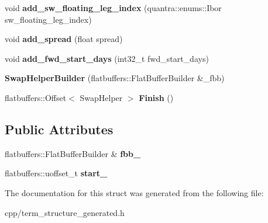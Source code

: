 \begin{DoxyCompactItemize}
void {\bfseries add\+\_\+sw\+\_\+floating\+\_\+leg\+\_\+index} (quantra\+::enums\+::\+Ibor sw\+\_\+floating\+\_\+leg\+\_\+index)
\item 
\mbox{\label{structquantra_1_1SwapHelperBuilder_ab94d6e15a57f3050b1f1666f11b54816}} 
void {\bfseries add\+\_\+spread} (float spread)
\item 
\mbox{\label{structquantra_1_1SwapHelperBuilder_a05700d90782f95a67c07dbb11b04e0ad}} 
void {\bfseries add\+\_\+fwd\+\_\+start\+\_\+days} (int32\+\_\+t fwd\+\_\+start\+\_\+days)
\item 
\mbox{\label{structquantra_1_1SwapHelperBuilder_a283641ed4c98e478c18e20b4c5f03aa2}} 
{\bfseries Swap\+Helper\+Builder} (flatbuffers\+::\+Flat\+Buffer\+Builder \&\+\_\+fbb)
\item 
\mbox{\label{structquantra_1_1SwapHelperBuilder_a73f189c6915df4a69ee15957fe16f0c1}} 
flatbuffers\+::\+Offset$<$ Swap\+Helper $>$ {\bfseries Finish} ()
\end{DoxyCompactItemize}
\subsection*{Public Attributes}
\begin{DoxyCompactItemize}
\item 
\mbox{\label{structquantra_1_1SwapHelperBuilder_a07560d63514f41a9510d5b51b1b53466}} 
flatbuffers\+::\+Flat\+Buffer\+Builder \& {\bfseries fbb\+\_\+}
\item 
\mbox{\label{structquantra_1_1SwapHelperBuilder_af5a8bd1d772ee0c1d915ec667202fd8d}} 
flatbuffers\+::uoffset\+\_\+t {\bfseries start\+\_\+}
\end{DoxyCompactItemize}


The documentation for this struct was generated from the following file\+:\begin{DoxyCompactItemize}
\item 
cpp/term\+\_\+structure\+\_\+generated.\+h\end{DoxyCompactItemize}
